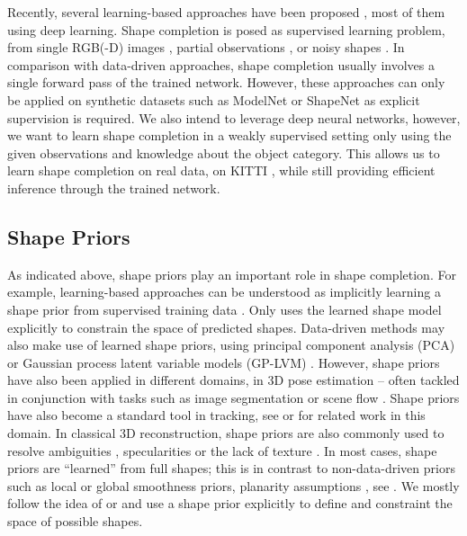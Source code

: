 Recently, several learning-based approaches have been proposed
\cite{RieglerGeiger:2017,FirmanBrostow:2016,SmithMeger:2017,DaiNiessner:2016,SharmaFritz:2016,
RezendeHeess:2016,FanSuGuibas:2016}, most of them using deep learning.
Shape completion is posed as supervised learning problem, \eg from single RGB(-D)
images \cite{FanSuGuibas:2016,GirdharGupta:2016}, partial observations
\cite{RieglerGeiger:2017,DaiNiessner:2016,RezendeHeess:2016,SmithMeger:2017},
or noisy shapes \cite{SharmaFritz:2016}. In comparison with data-driven approaches,
shape completion usually involves a single forward pass of the trained network.
However, these approaches can only be applied on synthetic datasets such as
ModelNet \cite{WuSongXiao:2015} or ShapeNet \cite{ChangFunkhouserGuibasSavarese:2015}
as explicit supervision is required. We also intend to leverage deep neural networks,
however, we want to learn shape completion in a weakly supervised setting
only using the given observations and knowledge about the object category.
This allows us to learn shape completion on real data, \eg on KITTI
\cite{GeigerLenzUrtasun:2012,GeigerLenzStillerUrtasun:2013}, while still
providing efficient inference through the trained network.

\subsection{Shape Priors}

As indicated above, shape priors play an important role in shape completion.
For example, learning-based approaches can be
understood as implicitly learning a shape prior from supervised training data
\cite{RieglerGeiger:2017,SmithMeger:2017,DaiNiessner:2016,SharmaFritz:2016,
RezendeHeess:2016,FanSuGuibas:2016}. Only \cite{GirdharGupta:2016} uses
the learned shape model explicitly to constrain the space of
predicted shapes. Data-driven methods may also make use of learned shape priors, \eg
using principal component analysis (PCA) \cite{EngelmannStuecklerLeibe:2016,EngelmannLeibe:2017}
or Gaussian process latent variable models (GP-LVM) \cite{DameReid:2013}.
However, shape priors have also been applied in different domains,
\eg in 3D pose estimation -- often tackled in conjunction with
tasks such as image segmentation \cite{AdrianReid:2012,DambrevilleTannenbaum:2008,
SandhuTannenbaum:2009} or scene flow \cite{MenzeHeipkeGeiger:2015}.
Shape priors have also become a standard tool in tracking, see \cite{MaSibley:2014}
or \cite{LeottaMundy:2009} for related work in this domain.
In classical 3D reconstruction, shape priors are also commonly used to resolve \eg ambiguities
\cite{GueneyGeiger:2015}, specularities \cite{DameReid:2013} or the lack of
texture \cite{BaoSavarese:2013}.
In most cases, shape priors are ``learned'' from full shapes; this is in contrast
to non-data-driven priors such as local or global smoothness priors,
planarity assumptions \etc, see \cite{BergerSilva:2014}.
We mostly follow the idea of \cite{EngelmannStuecklerLeibe:2016,EngelmannLeibe:2017,
DameReid:2013} or \cite{GirdharGupta:2016} and use a shape prior explicitly to
define and constraint the space of possible shapes.

